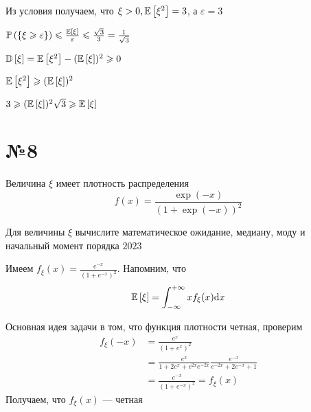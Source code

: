 \documentclass{article}
\begin{document}
Из условия получаем, что $\xi>0, \mathbb{E}\left[\xi^2\right]=3$, а $\varepsilon=3$

$\mathbb{P}\left(\{\xi\geqslant \varepsilon\}\right)\leqslant\frac{\mathbb{E}\left[\xi\right]}{\varepsilon}\leqslant \frac{\sqrt{3}}{3}=\frac{1}{\sqrt{3}}$

$\mathbb{D}\left[\xi\right]=\mathbb{E}\left[\xi^2\right]-(\mathbb{E}\left[\xi\right])^2\geqslant 0$

$\mathbb{E}\left[\xi^2\right]\geqslant (\mathbb{E}\left[\xi\right])^2$

$3\geqslant(\mathbb{E}\left[\xi\right])^2\sqrt{3}\geqslant\mathbb{E}\left[\xi\right]$

\section*{№8}
\begin{tcolorbox}[colback=blue!20!white, colframe=black!100!black]
    Величина $\xi$ имеет плотность распределения
\begin{equation*}
    f(x)=\frac{\exp (-x)}{(1+\exp (-x))^2}
\end{equation*}

Для величины $\xi$ вычислите математическое ожидание, медиану, моду и начальный момент порядка $2023$
\end{tcolorbox}

Имеем $f_{\xi}(x)=\displaystyle\frac{e^{-x}}{(1+e^{-x})^2}$. Напомним, что 
\begin{equation*}
    \mathbb{E}\left[\xi\right]=\int_{-\infty}^{+\infty}x f_{\xi}(x)\text{d}x
\end{equation*}

Основная идея задачи в том, что функция плотности четная, проверим
\begin{equation*}
    \begin{aligned}
        f_{\xi}(-x)&=\frac{e^x}{(1+e^x)^2}\\
        &=\frac{e^x}{1+2e^x+e^{2x}e^{-2x}}\frac{e^{-x}}{e^{-2x}+2e^{-x}+1}\\
        &=\frac{e^{-x}}{(1+e^{-x})^2}=f_{\xi}(x)
    \end{aligned}
\end{equation*}
Получаем, что $f_{\xi}(x)$ — четная




\end{document}
